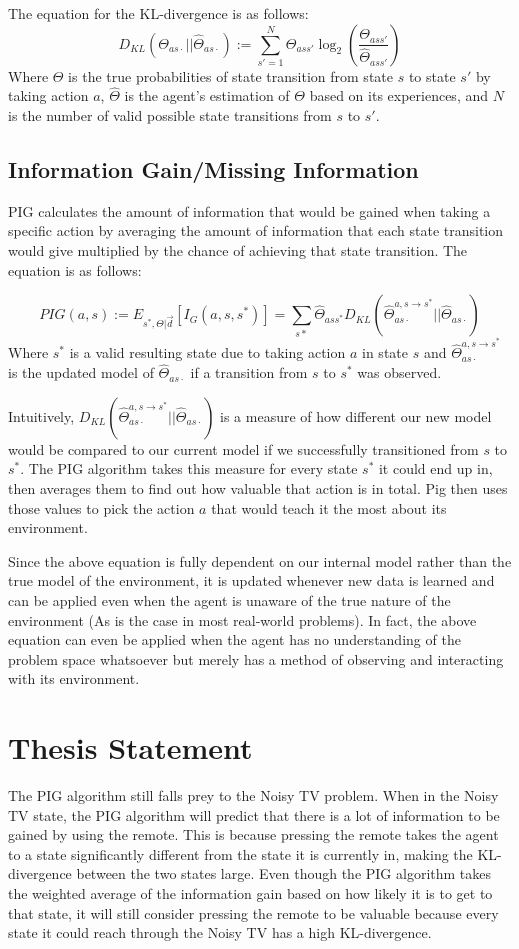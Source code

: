 \documentclass[12pt]{thesis}
\begin{document}
The equation for the KL-divergence is as follows:
\[D_{KL} (\Theta_{as\cdot} || \hat{\Theta}_{as\cdot}) := \sum_{s' = 1}^{ N} \Theta_{ass'} \log_{2}(\frac{\Theta_{ass'}}{\hat{\Theta}_{ass'}})   \]
Where $\Theta$ is the true probabilities of state transition from state $s$ to state $s'$ by taking action $a$, $\hat{\Theta}$ is the agent's estimation of $\Theta$ based on its experiences, and $N$ is the number of valid possible state transitions from $s$ to $s'$.

\subsection{Information Gain/Missing Information}
PIG calculates the amount of information that would be gained when taking a specific action by averaging the amount of information that each state transition would give multiplied by the chance of achieving that state transition. The equation is as follows:

\[ PIG(a,s) := E_{s^{*},\Theta|\vec{d}} [I_{G}(a,s,s^{*})] = \sum_{s*} \hat{\Theta}_{ass^{*}}D_{KL}(\hat{\Theta}_{as\cdot}^{a,s \rightarrow s^{*}} || \hat{\Theta}_{as\cdot}) \]
Where $s^{*}$ is a valid resulting state due to taking action $a$ in state $s$ and $\hat{\Theta}_{as\cdot}^{a,s \rightarrow s^{*}}$ is the updated model of $\hat{\Theta}_{as\cdot}$ if a transition from $s$ to $s^{*}$ was observed.

Intuitively, $D_{KL}(\hat{\Theta}_{as\cdot}^{a,s \rightarrow s^{*}} || \hat{\Theta}_{as\cdot})$ is a measure of how different our new model would be compared to our current model if we successfully transitioned from $s$ to $s^{*}$. The PIG algorithm takes this measure for every state $s^{*}$ it could end up in, then averages them to find out how valuable that action is in total. Pig then uses those values to pick the action $a$ that would teach it the most about its environment.

Since the above equation is fully dependent on our internal model rather than the true model of the environment, it is updated whenever new data is learned and can be applied even when the agent is unaware of the true nature of the environment (As is the case in most real-world problems). In fact, the above equation can even be applied when the agent has no understanding of the problem space whatsoever but merely has a method of observing and interacting with its environment.

\section{Thesis Statement}
The PIG algorithm still falls prey to the Noisy TV problem. When in the Noisy TV state, the PIG algorithm will predict that there is a lot of information to be gained by using the remote. This is because pressing the remote takes the agent to a state significantly different from the state it is currently in, making the KL-divergence between the two states large. Even though the PIG algorithm takes the weighted average of the information gain based on how likely it is to get to that state, it will still consider pressing the remote to be valuable because every state it could reach through the Noisy TV has a high KL-divergence.
\end{document}
